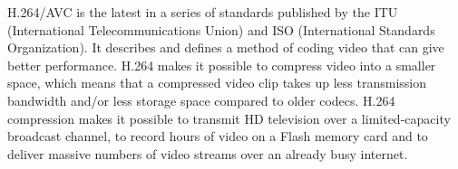 \documentclass[../main.tex]{subfiles}
\begin{document}
H.264/AVC is the latest in a series of standards published by the ITU (International Telecommunications Union) and ISO (International Standards Organization). It describes and defines a method of coding video that can give better performance. H.264 makes it possible to compress video into a smaller space, which means that a compressed video clip takes up less transmission bandwidth and/or less storage space compared to older codecs. H.264 compression makes it possible to transmit HD television over a limited-capacity broadcast channel, to record hours of video on a Flash memory card and to deliver massive numbers of video streams over an already busy internet.

\end{document}
